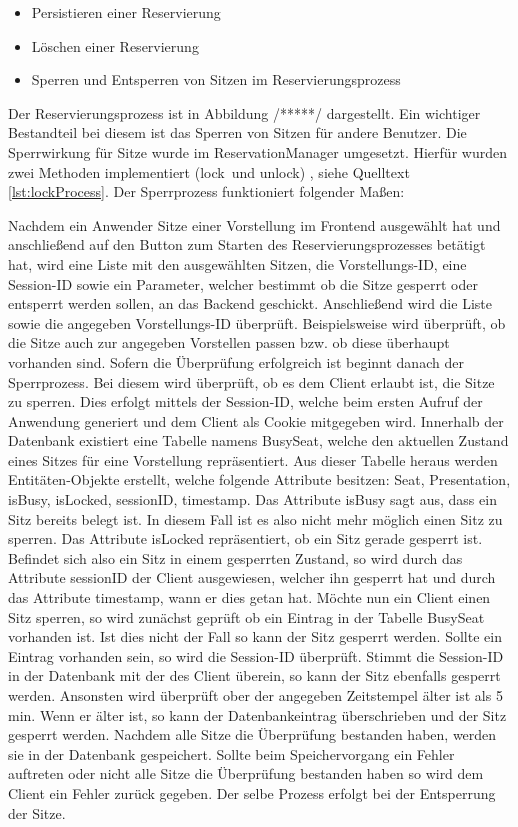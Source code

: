 \begin{itemize}
	\setlength\itemsep{-0.5em}
	\item Persistieren einer Reservierung
	\item Löschen einer Reservierung
	\item Sperren und Entsperren von Sitzen im Reservierungsprozess
\end{itemize}

Der Reservierungsprozess ist in Abbildung /*****/ dargestellt. Ein wichtiger Bestandteil bei diesem ist das Sperren von Sitzen für andere Benutzer. Die Sperrwirkung für Sitze wurde im ReservationManager umgesetzt. Hierfür wurden zwei Methoden implementiert (\glqq lock\grqq \, und \glqq unlock\grqq) , siehe Quelltext \ref{lst:lockProcess}. Der Sperrprozess funktioniert folgender Maßen:

Nachdem ein Anwender Sitze einer Vorstellung im Frontend ausgewählt hat und anschließend auf den Button zum Starten des Reservierungsprozesses betätigt hat, wird eine Liste mit den ausgewählten Sitzen, die Vorstellungs-\ac{ID}, eine Session-\ac{ID} sowie ein Parameter, welcher bestimmt ob die Sitze gesperrt oder entsperrt werden sollen, an das Backend geschickt. Anschließend wird die Liste sowie die angegeben Vorstellungs-\ac{ID} überprüft. Beispielsweise wird überprüft, ob die Sitze auch zur angegeben Vorstellen passen bzw. ob diese überhaupt vorhanden sind. Sofern die Überprüfung erfolgreich ist beginnt danach der Sperrprozess. Bei diesem wird überprüft, ob es dem Client erlaubt ist, die Sitze zu sperren. Dies erfolgt mittels der Session-ID, welche beim ersten Aufruf der Anwendung generiert und dem Client als Cookie mitgegeben wird. Innerhalb der Datenbank existiert eine Tabelle namens \glqq BusySeat\grqq, welche den aktuellen Zustand eines Sitzes für eine Vorstellung repräsentiert. Aus dieser Tabelle heraus werden Entitäten-Objekte erstellt, welche folgende Attribute besitzen: \glqq Seat, Presentation, isBusy, isLocked, sessionID, timestamp\grqq. Das Attribute isBusy sagt aus, dass ein Sitz bereits belegt ist. In diesem Fall ist es also nicht mehr möglich einen Sitz zu sperren. Das Attribute isLocked repräsentiert, ob ein Sitz gerade gesperrt ist. Befindet sich also ein Sitz in einem gesperrten Zustand, so wird durch das Attribute sessionID der Client ausgewiesen, welcher ihn gesperrt hat und durch das Attribute timestamp, wann er dies getan hat. Möchte nun ein Client einen Sitz sperren, so wird zunächst geprüft ob ein Eintrag in der Tabelle BusySeat vorhanden ist. Ist dies nicht der Fall so kann der Sitz gesperrt werden. Sollte ein Eintrag vorhanden sein, so wird die Session-ID überprüft. Stimmt die Session-ID in der Datenbank mit der des Client überein, so kann der Sitz ebenfalls gesperrt werden. Ansonsten wird überprüft ober der angegeben Zeitstempel älter ist als 5 min. Wenn er älter ist, so kann der Datenbankeintrag überschrieben und der Sitz gesperrt werden. Nachdem alle Sitze die Überprüfung bestanden haben, werden sie in der Datenbank gespeichert. Sollte beim Speichervorgang ein Fehler auftreten oder nicht alle Sitze die Überprüfung bestanden haben so wird dem Client ein Fehler zurück gegeben. Der selbe Prozess erfolgt bei der Entsperrung der Sitze.

